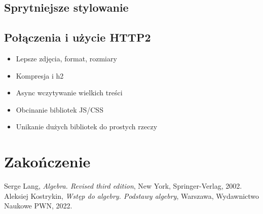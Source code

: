 \documentclass[licencjacka]{pracadypl}
\begin{document}
\section{Sprytniejsze stylowanie}


\section{Połączenia i użycie HTTP2}


\vspace{5em}

\begin{itemize}
  \item Lepsze zdjęcia, format, rozmiary
  \item Kompresja i h2
  \item Async wczytywanie wielkich treści
  \item Obcinanie bibliotek JS/CSS
  \item Unikanie dużych bibliotek do prostych rzeczy
\end{itemize}


\chapter{Zakończenie}


\begin{thebibliography}{7}
%
Serge Lang, 
\textit{Algebra. Revised third edition}, 
New York, Springer-Verlag, 2002.
%
Aleksiej Kostrykin, 
\textit{Wstęp do algebry. Podstawy algebry},
Warszawa, Wydawnictwo Naukowe PWN, 2022.
\end{thebibliography}
\end{document}
